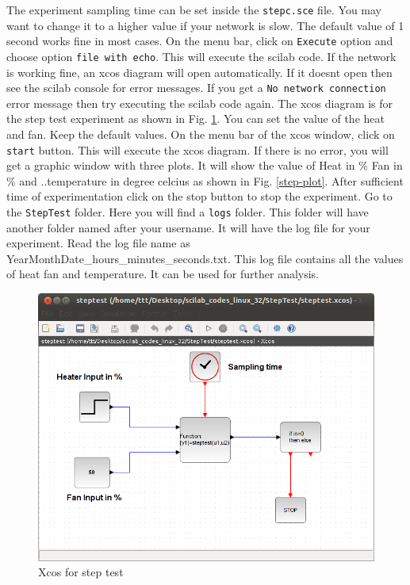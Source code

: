 The experiment sampling time can be set inside the  {\tt stepc.sce} file. You may want to change it to a higher value if your network is slow. The default value of 1 second works fine in most cases. On the menu bar, click on {\tt Execute} option and choose option {\tt file with echo}. This will execute  the scilab code. If the network is working fine, an xcos diagram will open automatically. If it doesnt open then see the scilab console for error messages. If you get a {\tt No network connection} error message then try executing the scilab code again. The xcos diagram is for the step test experiment as shown in Fig. \ref{step-xcos}. You can set the value of the heat and fan. Keep the default values. On the menu bar of the xcos window, click on {\tt start} button. This will execute the xcos diagram. If there is no error, you will get a graphic window with three plots. It will show the value of Heat in \% Fan in \% and ..temperature in degree celcius as shown in Fig. \ref{step-plot}. After sufficient time of experimentation click on the stop button to stop the experiment. Go to the {\tt StepTest} folder. Here you will find a {\tt logs} folder. This folder will have another folder named after your username. It will have the log file for your experiment. Read the log file name as\\ YearMonthDate\_hours\_minutes\_seconds.txt. This log file contains all the values of heat fan and temperature. It can be used for further analysis.

\begin{figure}
\centering
\includegraphics[width=0.7\linewidth]{vlabs/step-xcos.png}
\caption{Xcos for step test}
\label{step-xcos}
\end{figure}



